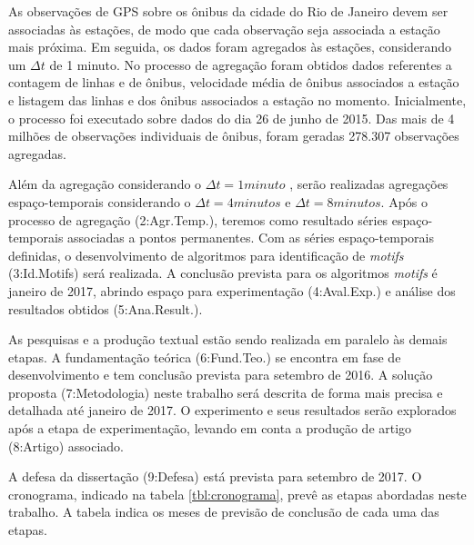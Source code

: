 \documentclass[12pt]{report} %
\begin{document}
As observações de GPS sobre os ônibus da cidade do Rio de Janeiro devem ser associadas às estações, de modo que cada observação seja associada a estação mais próxima. Em seguida, os dados foram agregados às estações, considerando um $\Delta t$ de 1 minuto. No processo de agregação foram obtidos dados referentes a contagem de linhas e de ônibus, velocidade média de ônibus associados a estação e listagem das linhas e dos ônibus associados a estação no momento. Inicialmente, o processo foi executado sobre dados do dia 26 de junho de 2015. Das mais de 4 milhões de observações individuais de ônibus, foram geradas 278.307 observações agregadas.

Além da agregação considerando o $\Delta t = 1 minuto$ , serão realizadas agregações espaço-temporais considerando o $\Delta t = 4 minutos$ e $\Delta t = 8 minutos$. Após o processo de agregação (2:Agr.Temp.), teremos como resultado séries espaço-temporais associadas a pontos permanentes. Com as séries espaço-temporais definidas, o desenvolvimento de algoritmos para identificação de \emph{motifs} (3:Id.Motifs) será realizada. A conclusão prevista para os algoritmos \textit{motifs} é janeiro de 2017, abrindo espaço para experimentação (4:Aval.Exp.) e análise dos resultados obtidos (5:Ana.Result.). 

As pesquisas e a produção textual estão sendo realizada em paralelo às demais etapas. A fundamentação teórica (6:Fund.Teo.) se encontra em fase de desenvolvimento e tem conclusão prevista para setembro de 2016. A solução proposta (7:Metodologia) neste trabalho será descrita de forma mais precisa e detalhada até janeiro de 2017. O experimento e seus resultados serão explorados após a etapa de experimentação, levando em conta a produção de artigo (8:Artigo) associado. 

A defesa da dissertação (9:Defesa) está prevista para setembro de 2017. O cronograma, indicado na tabela \ref{tbl:cronograma}, prevê as etapas abordadas neste trabalho. A tabela indica os meses de previsão de conclusão de cada uma das etapas.
\end{document}
